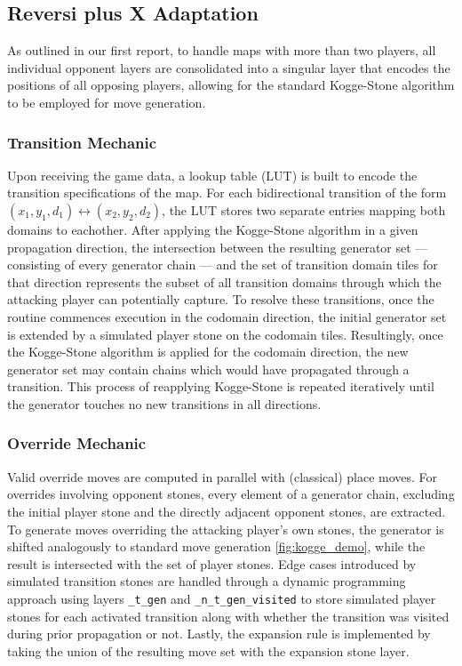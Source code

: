 \subsection*{Reversi plus X Adaptation}
As outlined in our first report, to handle maps with more than two players, all individual opponent layers are consolidated into a singular layer that encodes the positions of all opposing players, allowing for the standard Kogge-Stone algorithm to be employed for move generation.

\subsubsection*{Transition Mechanic}
Upon receiving the game data, a lookup table (LUT) is built to encode the transition specifications of the map. 
For each bidirectional transition of the form \(\left(x_1, y_1, d_1\right) \leftrightarrow \left(x_2, y_2, d_2\right)\), the LUT stores two separate entries mapping both domains to eachother. After applying the Kogge-Stone algorithm in a given propagation direction, the intersection between the resulting generator set --- consisting of every generator chain --- and the set of transition domain tiles for that direction represents the subset of all transition domains through which the attacking player can potentially capture. To resolve these transitions, once the routine commences execution in the codomain direction, the initial generator set is extended by a simulated player stone on the codomain tiles. Resultingly, once the Kogge-Stone algorithm is applied for the codomain direction, the new generator set may contain chains which would have propagated through a transition. This process of reapplying Kogge-Stone is repeated iteratively until the generator touches no new transitions in all directions.

\subsubsection*{Override Mechanic}
Valid override moves are computed in parallel with (classical) place moves. For overrides involving opponent stones, every element of a generator chain, excluding the initial player stone and the directly adjacent opponent stones, are extracted. To generate moves overriding the attacking player's own stones, the generator is shifted analogously to standard move generation \ref{fig:kogge_demo}, while the result is intersected with the set of player stones. Edge cases introduced by simulated transition stones are handled through a dynamic programming approach using layers \texttt{\_t\_gen} and \texttt{\_n\_t\_gen\_visited} to store simulated player stones for each activated transition along with whether the transition was visited during prior propagation or not. Lastly, the expansion rule is implemented by taking the union of the resulting move set with the expansion stone layer.

